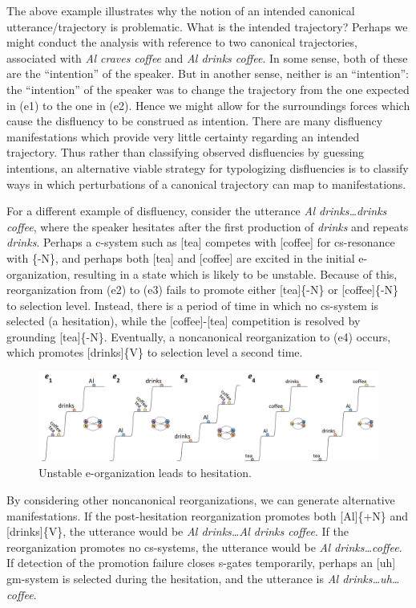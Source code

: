   The above example illustrates why the notion of an intended canonical utterance/trajectory is problematic. What is the intended trajectory? Perhaps we might conduct the analysis with reference to two canonical trajectories, associated with \textit{Al craves coffee} and \textit{Al drinks coffee}. In some sense, both of these are the “intention” of the speaker. But in another sense, neither is an “intention”: the “intention” of the speaker was to change the trajectory from the one expected in (e1) to the one in (e2). Hence we might allow for the surroundings forces which cause the disfluency to be construed as intention. There are many disfluency manifestations which provide very little certainty regarding an intended trajectory. Thus rather than classifying observed disfluencies by guessing intentions, an alternative viable strategy for typologizing disfluencies is to classify ways in which perturbations of a canonical trajectory can map to manifestations.

  For a different example of disfluency, consider the utterance \textit{Al drinks…drinks coffee}, where the speaker hesitates after the first production of \textit{drinks} and repeats \textit{drinks}. Perhaps a c-system such as [tea] competes with [coffee] for cs-resonance with \{-N\}, and perhaps both [tea] and [coffee] are excited in the initial e-organization, resulting in a state which is likely to be unstable. Because of this, reorganization from (e2) to (e3) fails to promote either [tea]\{-N\} or [coffee]\{-N\} to selection level. Instead, there is a period of time in which no cs-system is selected (a hesitation), while the [coffee]-[tea] competition is resolved by grounding [tea]\{-N\}. Eventually, a noncanonical reorganization to (e4) occurs, which promotes [drinks]\{V\} to selection level a second time. 

  
\begin{figure}
\includegraphics[width=\textwidth]{figures/Tilsen-img61.png}
\caption{Unstable e-organization leads to hesitation.}
\label{fig:4:11}
\end{figure}
 

  By considering other noncanonical reorganizations, we can generate alternative manifestations. If the post-hesitation reorganization promotes both [Al]\{+N\} and [drinks]\{V\}, the utterance would be \textit{Al drinks…Al drinks coffee}. If the reorganization promotes no cs-systems, the utterance would be \textit{Al drinks…coffee}. If detection of the promotion failure closes s-gates temporarily, perhaps an [uh] gm-system is selected during the hesitation, and the utterance is \textit{Al drinks…uh…coffee}.

